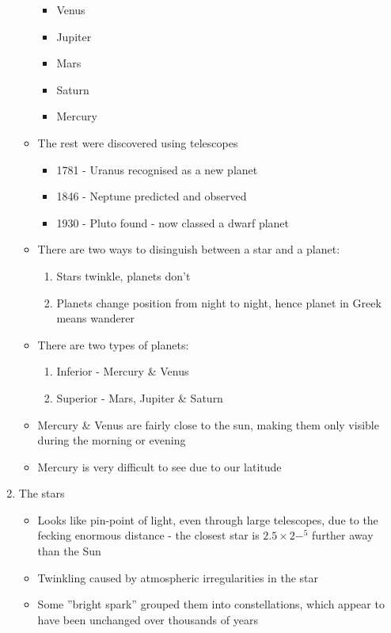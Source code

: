 \documentclass[a4paper, 11pt]{article}
\begin{document}
\begin{enumerate}
\begin{itemize}
				\begin{itemize}
					\item Venus
					\item Jupiter
					\item Mars
					\item Saturn
					\item Mercury
				\end{itemize}
			\item The rest were discovered using telescopes
				\begin{itemize}
					\item 1781 - Uranus recognised as a new planet
					\item 1846 - Neptune predicted and observed
					\item 1930 - Pluto found - now classed a dwarf planet
				\end{itemize}
			\item There are two ways to disinguish between a star and a planet:
				\begin{enumerate}
					\item Stars twinkle, planets don't
					\item Planets change position from night to night, hence planet in Greek means wanderer
				\end{enumerate}
			\item There are two types of planets:
				\begin{enumerate}
					\item Inferior - Mercury \& Venus
					\item Superior - Mars, Jupiter \& Saturn
				\end{enumerate}
			\item Mercury \& Venus are fairly close to the sun, making them only visible during the morning or evening
			\item Mercury is very difficult to see due to our latitude
		\end{itemize}
	\item The stars
		\begin{itemize}
			\item Looks like pin-point of light, even through large telescopes, due to the fecking enormous distance - the closest star is \(2.5\times2-^5\) further away than the Sun
			\item Twinkling caused by atmospheric irregularities in the star
			\item Some ''bright spark'' grouped them into constellations, which appear to have been unchanged over thousands of years

\end{itemize}
\end{enumerate}
\end{document}
